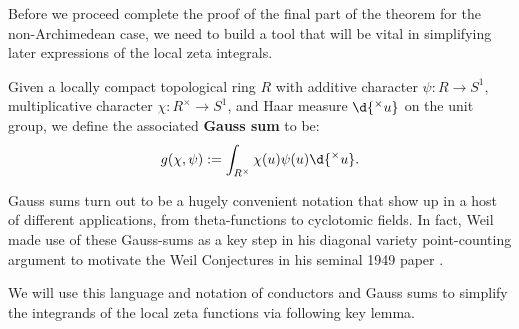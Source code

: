 \documentclass[11pt, x11names, openany]{book}
\begin{document}
Before we proceed complete the proof of the final part of the theorem for the non-Archimedean case, we need to build a tool that will be vital in simplifying later expressions of the local zeta integrals.
\begin{defn}
    \label{def: Gauss sum}
    Given a locally compact topological ring $R$ with additive character $\psi: R \to S^1$, multiplicative character $\chi: R^\times \to S^1$, and Haar measure $\d{^\times u}$ on the unit group, we define the associated \textbf{Gauss sum} to be:
    \begin{equation*}
        g(\chi, \psi) := \int_{R^\times} \chi(u) \psi(u) \d{^\times  u}.
    \end{equation*}
    \end{defn}
    \begin{remark}
        Gauss sums turn out to be a hugely convenient notation that show up in a host of different applications, from theta-functions to cyclotomic fields. In fact, Weil made use of these Gauss-sums as a key step in his diagonal variety point-counting argument to motivate the Weil Conjectures in his seminal 1949 paper \cite{WeilOG_Paper}.
    \end{remark}

We will use this language and notation of conductors and Gauss sums to simplify the integrands of the local zeta functions via following key lemma.
\end{document}
